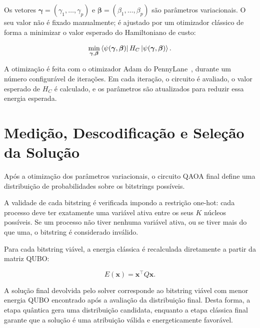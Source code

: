 Os vetores $\boldsymbol{\gamma}=(\gamma_1,\dots,\gamma_p)$ e
$\boldsymbol{\beta}=(\beta_1,\dots,\beta_p)$ são parâmetros variacionais. O seu
valor não é fixado manualmente; é ajustado por um otimizador clássico de forma a
minimizar o valor esperado do Hamiltoniano de custo:

\begin{equation}
    \min_{\boldsymbol{\gamma},\boldsymbol{\beta}}
    \bra{\psi(\boldsymbol{\gamma},\boldsymbol{\beta})}
    H_C
    \ket{\psi(\boldsymbol{\gamma},\boldsymbol{\beta})}.
\end{equation}

A otimização é feita com o otimizador
Adam do PennyLane~\cite{Kingma2014Adam}, durante um número configurável de iterações. Em cada iteração,
o circuito é avaliado, o valor esperado de $H_C$ é calculado, e os parâmetros são
atualizados para reduzir essa energia esperada.

\section{Medição, Descodificação e Seleção da Solução}
\label{sec:medicao-descodificacao-selecao}

Após a otimização dos parâmetros variacionais, o circuito \acs{QAOA} final define uma distribuição de probabilidades sobre os bitstrings possíveis.

A validade de cada bitstring é verificada impondo a restrição one-hot: cada processo
deve ter exatamente uma variável ativa entre os seus $K$ núcleos possíveis. Se um
processo não tiver nenhuma variável ativa, ou se tiver mais do que uma, o bitstring
é considerado inválido.

Para cada bitstring viável, a energia clássica é recalculada diretamente a partir
da matriz \acs{QUBO}:

\begin{equation}
    E(\mathbf{x}) = \mathbf{x}^{\top}Q\mathbf{x}.
\end{equation}

A solução final devolvida pelo solver corresponde ao bitstring viável com menor
energia \acs{QUBO} encontrado após a avaliação da distribuição final. Desta forma, a
etapa quântica gera uma distribuição candidata, enquanto a etapa clássica final
garante que a solução é uma atribuição válida e energeticamente favorável.
